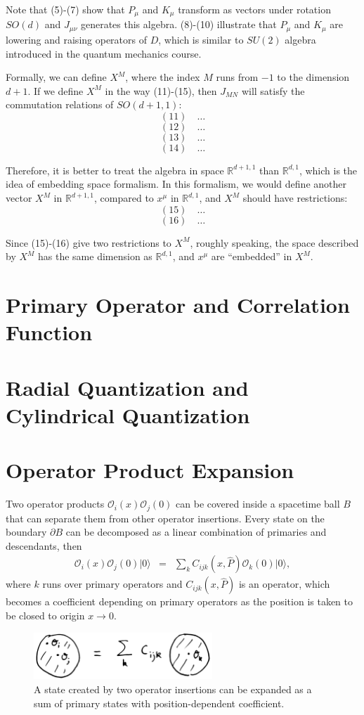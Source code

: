 \documentclass[12pt]{article}
\numberwithin{equation}{section}
\newcommand\be{\begin{eqnarray}}
\newcommand\ee{\end{eqnarray}}
\newcommand\cO{\mathcal{O}}
\newcommand\<\langle
\renewcommand\>\rangle
\renewcommand\.{\cdot}
\begin{document}
Note that (5)-(7) show that $P_\mu$ and $K_\mu$ transform as vectors under rotation $SO(d)$ and $J_{\mu\nu}$ generates this algebra. (8)-(10) illustrate that $P_\mu$ and $K_\mu$ are lowering and raising operators of $D$, which is similar to $SU(2)$ algebra introduced in the quantum mechanics course.

Formally, we can define $X^M$, where the index $M$ runs from $-1$ to the dimension $d+1$. If we define $X^M$ in the way (11)-(15), then $J_{MN}$ will satisfy the commutation relations of $SO(d+1,1)$:
\[
(11) \quad \ldots
\]
\[
(12) \quad \ldots
\]
\[
(13) \quad \ldots
\]
\[
(14) \quad \ldots
\]

Therefore, it is better to treat the algebra in space $\mathbb{R}^{d+1,1}$ than $\mathbb{R}^{d,1}$, which is the idea of embedding space formalism. In this formalism, we would define another vector $X^M$ in $\mathbb{R}^{d+1,1}$, compared to $x^\mu$ in $\mathbb{R}^{d,1}$, and $X^M$ should have restrictions:
\[
(15) \quad \ldots
\]
\[
(16) \quad \ldots
\]

Since (15)-(16) give two restrictions to $X^M$, roughly speaking, the space described by $X^M$ has the same dimension as $\mathbb{R}^{d,1}$, and $x^\mu$ are “embedded” in $X^M$.


\section{Primary Operator and Correlation Function}
\section{Radial Quantization and Cylindrical Quantization}
\section{Operator Product Expansion}

Two operator products $\cO_i(x)\cO_j(0)$ can be covered inside a spacetime ball $B$ that can separate them from other operator insertions. Every state on the boundary $\partial B$ can be decomposed as a linear combination of primaries and descendants, then
\be
\label{eq:opeinitial}
\cO_i(x)\cO_j(0)|0\> &=& \sum_{k}C_{ijk}(x,\hat{P})\cO_k(0) |0\>,
\ee
where $k$ runs over primary operators and $C_{ijk}(x, \hat{P})$ is an operator, which becomes a coefficient depending on primary operators as the position is taken to be closed to origin $x\rightarrow 0$.

\begin{figure}[h]
\begin{center}
\includegraphics[width=0.6\textwidth]{ope.jpg}
\end{center}
\caption{A state created by two operator insertions can be expanded as a sum of primary states with position-dependent coefficient.  
\label{fig:ope}}
\end{figure}
\end{document}
